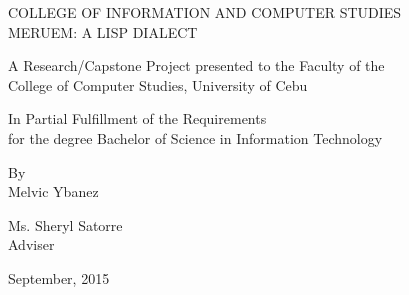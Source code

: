 \begin{titlepage}
	\begin{center}
		\vspace*{1cm}
		\large
		\uppercase{COLLEGE OF INFORMATION AND COMPUTER STUDIES}\\
		\uppercase{MERUEM: A LISP DIALECT}

		\vfill
		A Research/Capstone Project presented to the Faculty of the\\
		College of Computer Studies, University of Cebu
		
		\vfill
		In Partial Fulfillment of the Requirements\\
		for the degree Bachelor of Science in Information Technology
		
		\vfill
		By\\
		Melvic Ybanez
		
		\vfill
		Ms. Sheryl Satorre\\
		Adviser
		
		\vfill
		September, 2015
		
		\vspace*{1cm}
	\end{center}
\end{titlepage}